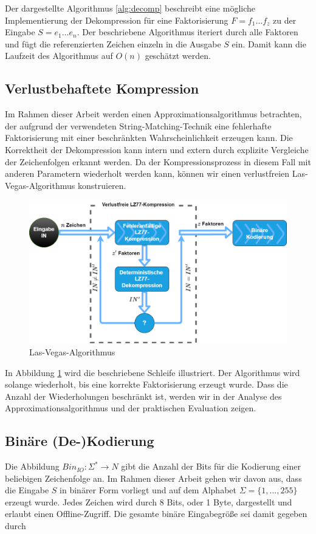 Der dargestellte Algorithmus \ref{alg:decomp} beschreibt eine mögliche Implementierung der Dekompression für eine Faktorisierung $F=f_1...f_z$ zu der Eingabe $S=e_1...e_n$.
Der beschriebene Algorithmus iteriert durch alle Faktoren und fügt die referenzierten Zeichen einzeln in die Ausgabe $S$ ein. Damit kann die Laufzeit des Algorithmus auf $O(n)$
geschätzt werden.

\subsection{Verlustbehaftete Kompression}
Im Rahmen dieser Arbeit werden einen Approximationsalgorithmus betrachten, der aufgrund der verwendeten String-Matching-Technik eine fehlerhafte Faktorisierung mit einer 
beschränkten Wahrscheinlichkeit erzeugen kann. Die Korrektheit der Dekompression kann intern und extern durch explizite Vergleiche der Zeichenfolgen erkannt werden. Da der
Kompressionsprozess in diesem Fall mit anderen Parametern wiederholt werden kann, können wir einen verlustfreien Las-Vegas-Algorithmus konstruieren.

\begin{figure}
    \centering
    \caption{Las-Vegas-Algorithmus}
    \label{fig:lasvegas}
    \includegraphics[scale=0.25]{Images/lasvegas_algorithm.png}
\end{figure}

In Abbildung \ref{fig:lasvegas} wird die beschriebene Schleife illustriert. Der Algorithmus wird solange wiederholt, bis eine korrekte Faktorisierung erzeugt wurde. Dass die
Anzahl der Wiederholungen beschränkt ist, werden wir in der Analyse des Approximationsalgorithmus und der praktischen Evaluation zeigen.

\subsection{Binäre (De-)Kodierung}
Die Abbildung $Bin_{IO}: \Sigma^* \rightarrow N$ gibt die Anzahl der Bits für die Kodierung einer beliebigen Zeichenfolge an. Im Rahmen dieser Arbeit gehen wir davon aus, dass die 
Eingabe $S$ in binärer Form vorliegt und auf dem Alphabet $\Sigma=\{1,...,255\}$ erzeugt wurde. Jedes Zeichen wird durch 8 Bits, oder 1 Byte, dargestellt und erlaubt einen 
Offline-Zugriff. Die gesamte binäre Eingabegröße sei damit gegeben durch 

